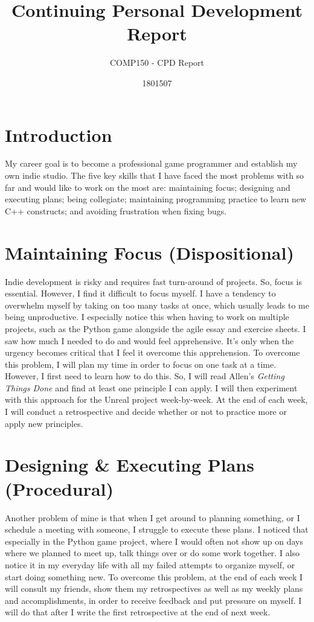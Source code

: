 \documentclass{scrartcl}
\title{Continuing Personal Development Report}
\subtitle{COMP150 - CPD Report}
\author{1801507}
\begin{document}
\maketitle

\section{Introduction}
My career goal is to become a professional game programmer and establish my own indie studio. The five key skills that I have faced the most problems with so far and would like to work on the most are: maintaining focus; designing and executing plans; being collegiate; maintaining programming practice to learn new C++ constructs; and avoiding frustration when fixing bugs.

\section{Maintaining Focus (Dispositional)}

Indie development is risky and requires fast turn-around of projects. So, focus is essential. However, I find it difficult to focus myself. I have a tendency to overwhelm myself by taking on too many tasks at once, which usually leads to me being unproductive. I especially notice this when having to work on multiple projects, such as the Python game alongside the agile essay and exercise sheets. I saw how much I needed to do and would feel apprehensive. It's only when the urgency becomes critical that I feel it overcome this apprehension. To overcome this problem, I will plan my time in order to focus on one task at a time. However, I first need to learn how to do this. So, I will read Allen's \textit{Getting Things Done} and find at least one principle I can apply. I will then experiment with this approach for the Unreal project week-by-week. At the end of each week, I will conduct a retrospective and decide whether or not to practice more or apply new principles.

\section{Designing \& Executing Plans (Procedural)}

Another problem of mine is that when I get around to planning something, or I schedule a meeting with someone, I struggle to execute these plans. I noticed that especially in the Python game project, where I would often not show up on days where we planned to meet up, talk things over or do some work together. I also notice it in my everyday life with all my failed attempts to organize myself, or start doing something new. To overcome this problem, at the end of each week I will consult my friends, show them my retrospectives as well as my weekly plans and accomplishments, in order to receive feedback and put pressure on myself. I will do that after I write the first retrospective at the end of next week.
\end{document}
